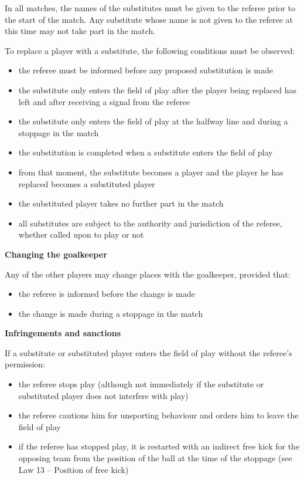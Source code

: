 \headlinebox

In all matches, the names of the substitutes must be given to the referee prior to the start of the match. Any substitute whose name is not given to the referee at this time may not take part in the match.

\bigskip

To replace a player with a substitute, the following conditions must be observed:

\begin{itemize}
\item the referee must be informed before any proposed substitution is made
\item the substitute only enters the field of play after the player being replaced has left and after receiving a signal from the referee
\item the substitute only enters the field of play at the halfway line and during a stoppage in the match 
\item the substitution is completed when a substitute enters the field of play
\item from that moment, the substitute becomes a player and the player he has replaced becomes a substituted player 
\item the substituted player takes no further part in the match
\item all substitutes are subject to the authority and jurisdiction of the referee, whether called upon to play or not
\end{itemize}

{\bfseries Changing the goalkeeper}

\headlinebox

Any of the other players may change places with the goalkeeper, provided that:

\begin{itemize}
\item the referee is informed before the change is made
\item the change is made during a stoppage in the match
\end{itemize}

{\bfseries Infringements and sanctions}

\headlinebox

If a substitute or substituted player enters the field of play without the referee's permission:

\begin{itemize}
\item the referee stops play (although not immediately if the substitute or substituted player does not interfere with play)
\item the referee cautions him for unsporting behaviour and orders him to leave the field of play 
\item if the referee has stopped play, it is restarted with an indirect free kick for the opposing team from the position of the ball at the time of the stoppage (see Law 13 -- Position of free kick)
\end{itemize}


